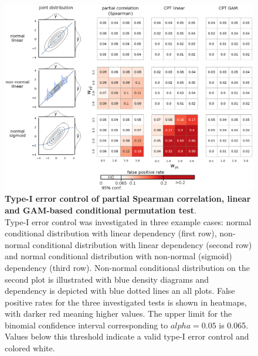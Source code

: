 \documentclass{article}
\begin{document}
\begin{figure}[!b]
  \centering
  \includegraphics[width=0.75\paperwidth]{fig/sim_h0_demo.eps}
  \caption{\textbf{Type-I error control of partial Spearman correlation, linear and GAM-based conditional permutation test}. \\
  Type-I error control was investigated in three example cases: normal conditional distribution with linear dependency (first row), non-normal conditional distribution with linear dependency (second row) and normal conditional distribution with non-normal (sigmoid) dependency (third row). Non-normal conditional distribution on the second plot is illustrated with blue density diagrams and dependency is depicted with blue dotted lines an all plots. False positive rates for the three investigated tests is shown in heatmaps, with darker red meaning higher values. The upper limit for the binomial confidence interval corresponding to $alpha=0.05$ is 0.065. Values below this threshold indicate a valid type-I error control and colored white.
  }
  \label{fig:sim-h0-demo}
\end{figure}
\end{document}
